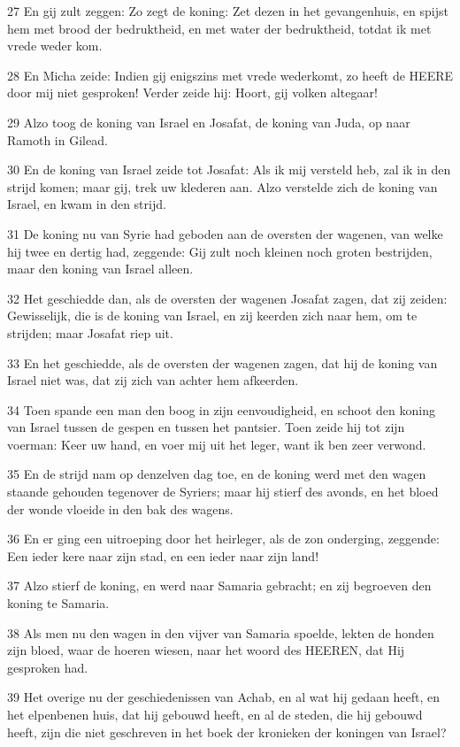 \par 27 En gij zult zeggen: Zo zegt de koning: Zet dezen in het gevangenhuis, en spijst hem met brood der bedruktheid, en met water der bedruktheid, totdat ik met vrede weder kom.
\par 28 En Micha zeide: Indien gij enigszins met vrede wederkomt, zo heeft de HEERE door mij niet gesproken! Verder zeide hij: Hoort, gij volken altegaar!
\par 29 Alzo toog de koning van Israel en Josafat, de koning van Juda, op naar Ramoth in Gilead.
\par 30 En de koning van Israel zeide tot Josafat: Als ik mij versteld heb, zal ik in den strijd komen; maar gij, trek uw klederen aan. Alzo verstelde zich de koning van Israel, en kwam in den strijd.
\par 31 De koning nu van Syrie had geboden aan de oversten der wagenen, van welke hij twee en dertig had, zeggende: Gij zult noch kleinen noch groten bestrijden, maar den koning van Israel alleen.
\par 32 Het geschiedde dan, als de oversten der wagenen Josafat zagen, dat zij zeiden: Gewisselijk, die is de koning van Israel, en zij keerden zich naar hem, om te strijden; maar Josafat riep uit.
\par 33 En het geschiedde, als de oversten der wagenen zagen, dat hij de koning van Israel niet was, dat zij zich van achter hem afkeerden.
\par 34 Toen spande een man den boog in zijn eenvoudigheid, en schoot den koning van Israel tussen de gespen en tussen het pantsier. Toen zeide hij tot zijn voerman: Keer uw hand, en voer mij uit het leger, want ik ben zeer verwond.
\par 35 En de strijd nam op denzelven dag toe, en de koning werd met den wagen staande gehouden tegenover de Syriers; maar hij stierf des avonds, en het bloed der wonde vloeide in den bak des wagens.
\par 36 En er ging een uitroeping door het heirleger, als de zon onderging, zeggende: Een ieder kere naar zijn stad, en een ieder naar zijn land!
\par 37 Alzo stierf de koning, en werd naar Samaria gebracht; en zij begroeven den koning te Samaria.
\par 38 Als men nu den wagen in den vijver van Samaria spoelde, lekten de honden zijn bloed, waar de hoeren wiesen, naar het woord des HEEREN, dat Hij gesproken had.
\par 39 Het overige nu der geschiedenissen van Achab, en al wat hij gedaan heeft, en het elpenbenen huis, dat hij gebouwd heeft, en al de steden, die hij gebouwd heeft, zijn die niet geschreven in het boek der kronieken der koningen van Israel?
